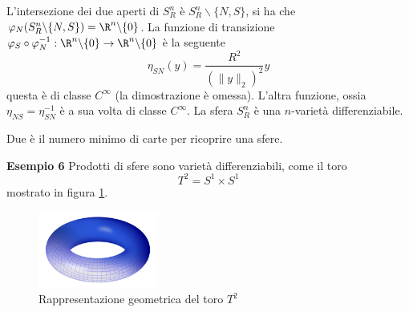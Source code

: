 \documentclass[10pt, letterpaper]{report}
\begin{document}
L'intersezione dei due aperti di $S_R^{n}$ è $S_R^{n}\backslash\{N,S\}$, si ha che $\varphi_N(S_R^{n}\backslash\{N,S\})=\R^n\backslash\{0\}$. La funzione di transizione $\varphi_S\circ\varphi_N^{-1}:\R^n\backslash\{0\}\rightarrow\R^n\backslash\{0\}$ è la seguente\begin{equation}
    \eta_{SN}(y)=\frac{R^2}{(\|y\|_2)^2}y
\end{equation}
questa è di classe $C^\infty$ (la dimostrazione è omessa). L'altra funzione, ossia $\eta_{NS}=\eta_{SN}^{-1}$ è a sua volta di classe $C^\infty$.
La sfera $S_R^{n}$ è una $n$-varietà differenziabile.
\begin{osservazione}
    Due è il numero minimo di carte per ricoprire una sfere.
\end{osservazione}
\textbf{Esempio 6} Prodotti di sfere sono varietà differenziabili, come il toro\begin{equation}
    T^2=S^1\times S^1
\end{equation}
mostrato in figura \ref{img:toro}.
\begin{figure}[h!]
    \center
    \includegraphics[width=0.35\textwidth ]{images/toro.pdf}
    \caption{Rappresentazione geometrica del toro $T^2$}
    \label{img:toro}
\end{figure}
\bigskip
\end{document}
